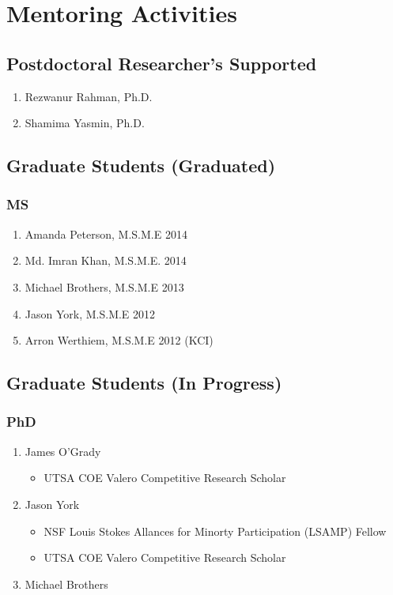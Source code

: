 \section*{Mentoring Activities}


\subsection*{Postdoctoral Researcher's Supported}
  \begin{enumerate}
    \item Rezwanur Rahman, Ph.D.
    \item Shamima Yasmin, Ph.D.
  \end{enumerate}

\subsection*{Graduate Students (Graduated)}

\subsubsection*{MS}
\begin{enumerate}
    \item Amanda Peterson, M.S.M.E 2014
    \item Md. Imran Khan, M.S.M.E. 2014
    \item Michael Brothers, M.S.M.E 2013
    \item Jason York, M.S.M.E 2012
    \item Arron Werthiem, M.S.M.E 2012 (KCI)
\end{enumerate}

\subsection*{Graduate Students (In Progress)}

\subsubsection*{PhD}
\begin{enumerate}
  \item James O'Grady
      \begin{itemize}
        \item UTSA COE Valero Competitive Research Scholar
      \end{itemize}
  \item Jason York
      \begin{itemize}
        \item NSF Louis Stokes Allances for Minorty Participation (LSAMP) Fellow
        \item UTSA COE Valero Competitive Research Scholar
      \end{itemize}
  \item Michael Brothers
\end{enumerate}

